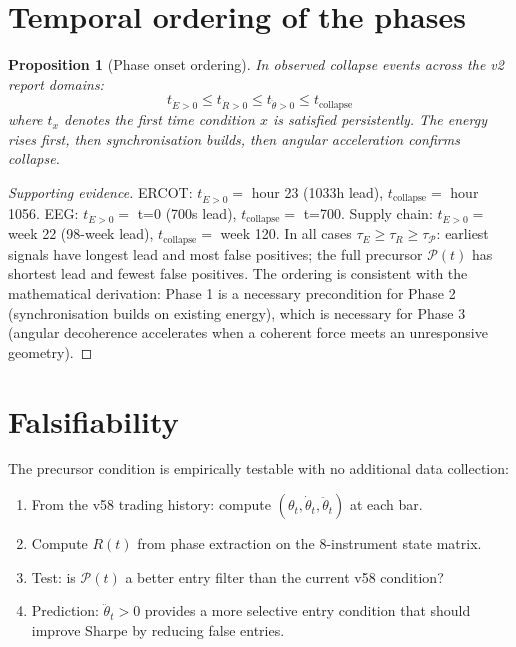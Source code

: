 \documentclass[11pt,a4paper,openany]{book}
\newtheorem{proposition}[theorem]{Proposition}
\theoremstyle{definition}
\begin{document}
\section{Temporal ordering of the phases}

\begin{proposition}[Phase onset ordering]
In observed collapse events across the v2 report domains:
\[
t_{\dot E > 0} \leq t_{\dot R > 0} \leq t_{\ddot\theta > 0} \leq t_\mathrm{collapse}
\]
where $t_x$ denotes the first time condition $x$ is satisfied persistently.
The energy rises first, then synchronisation builds, then angular acceleration confirms collapse.
\end{proposition}

\begin{proof}[Supporting evidence]
ERCOT: $t_{\dot E > 0} = $ hour 23 (1033h lead), $t_\mathrm{collapse} = $ hour 1056.
EEG: $t_{\dot E > 0} = $ t=0 (700s lead), $t_\mathrm{collapse} = $ t=700.
Supply chain: $t_{\dot E > 0} = $ week 22 (98-week lead), $t_\mathrm{collapse} = $ week 120.
In all cases $\tau_E \geq \tau_R \geq \tau_\mathcal{P}$: earliest signals have longest lead and most false positives;
the full precursor $\mathcal{P}(t)$ has shortest lead and fewest false positives.
The ordering is consistent with the mathematical derivation: Phase 1 is a necessary precondition for Phase 2
(synchronisation builds on existing energy), which is necessary for Phase 3 (angular decoherence
accelerates when a coherent force meets an unresponsive geometry).
\end{proof}

\section{Falsifiability}

The precursor condition is empirically testable with no additional data collection:

\begin{enumerate}
\item From the v58 trading history: compute $(\theta_t, \dot\theta_t, \ddot\theta_t)$ at each bar.
\item Compute $R(t)$ from phase extraction on the 8-instrument state matrix.
\item Test: is $\mathcal{P}(t)$ a better entry filter than the current v58 condition?
\item Prediction: $\ddot\theta_t > 0$ provides a more selective entry condition that should improve Sharpe by reducing false entries.
\end{enumerate}
\end{document}

